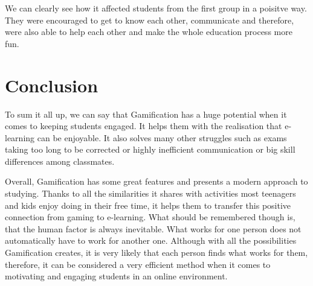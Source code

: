 \documentclass[10pt,english,a4paper]{article}
\begin{document}
	We can clearly see how it affected students from the first group in a poisitve way. 
	They were encouraged to get to know each other, communicate and therefore, were also able to help each other and make the whole education process more fun.

\section{Conclusion} \label{section5}
	To sum it all up, we can say that Gamification has a huge potential when it comes to keeping students engaged. 
	It helps them with the realisation that e-learning can be enjoyable.
	It also solves many other struggles such as exams taking too long to be corrected or highly inefficient communication or big skill differences among classmates.
	
	Overall, Gamification has some great features and presents a modern approach to studying. 
	Thanks to all the similarities it shares with activities most teenagers and kids enjoy doing in their free time, it helps them to transfer this positive connection from gaming to e-learning. 
	What should be remembered though is, that the human factor is always inevitable. What works for one person does not automatically have to work for another one.
	Although with all the possibilities Gamification creates, it is very likely that each person finds what works for them, therefore, it can be considered a very efficient method when it comes to motivating and engaging students in an online environment.



\end{document}
